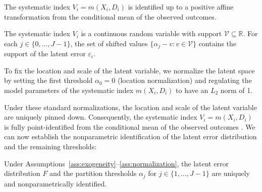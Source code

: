 \documentclass{article}
\numberwithin{figure}{section}
\numberwithin{table}{section}
\numberwithin{equation}{section}
\begin{document}
\begin{assumption}
The systematic index $V_i = m(X_i, D_i)$ is identified up to a positive affine transformation from the conditional mean of the observed outcomes.
\label{ass:index}
\end{assumption}

\begin{assumption}
The systematic index $V_i$ is a continuous random variable with support $\mathcal{V} \subseteq \mathbb{R}$. For each $j \in \{0, \dots, J-1\}$, the set of shifted values $\{\alpha_j - v : v \in \mathcal{V}\}$ contains the support of the latent error $\varepsilon_i$.
\label{ass:support}
\end{assumption}

\begin{assumption}[Normalizations]
\label{ass:normalization}
To fix the location and scale of the latent variable, we normalize the latent space by setting the first threshold $\alpha_0 = 0$ (location normalization) and regulating the model parameters of the systematic index $m(X_i, D_i)$ to have an $L_2$ norm of 1.
\end{assumption}

Under these standard normalizations, the location and scale of the latent variable are uniquely pinned down. Consequently, the systematic index $V_i = m(X_i, D_i)$ is fully point-identified from the conditional mean of the observed outcomes \citep{Manski1988a, Klein1993a}. We can now establish the nonparametric identification of the latent error distribution and the remaining thresholds:

\begin{theorem}
Under Assumptions~\ref{ass:exogeneity}--\ref{ass:normalization}, the latent error distribution $F$ and the partition thresholds $\alpha_j$ for $j \in \{1, \dots, J-1\}$ are uniquely and nonparametrically identified.
\end{theorem}
\end{document}
